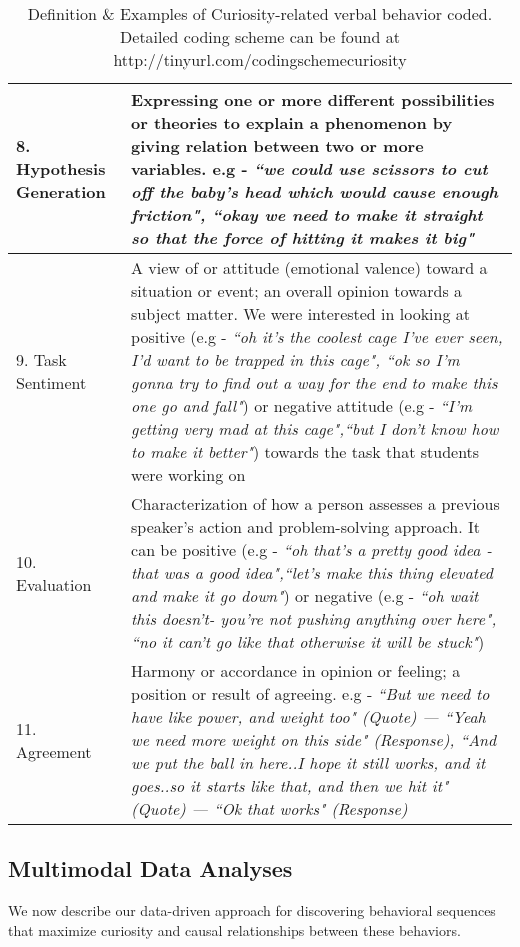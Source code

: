 \documentclass{llncs}
\begin{document}
\begin{table*} [hp]
{\begin{tabular}{|p{3.7cm}|p{13cm}|}
8. Hypothesis Generation & Expressing one or more different possibilities or theories to explain a phenomenon by giving relation between two or more variables. e.g - {\em ``we could use scissors to cut off the baby's head which would cause enough friction", ``okay we need to make it straight so that the force of hitting it makes it big"} \\ \hline
9. Task Sentiment & A view of or attitude (emotional valence) toward a situation or event; an overall opinion towards a subject matter. We were interested in looking at positive (e.g - {\em ``oh it's the coolest cage I've ever seen, I'd want to be trapped in this cage", ``ok so I'm gonna try to find out a way for the end to make this one go and fall"}) or negative attitude (e.g - {\em ``I'm getting very mad at this cage",``but I don't know how to make it better"}) towards the task that students were working on \\ \hline 
10. Evaluation  &  Characterization of how a person assesses a previous speaker’s action and problem-solving approach. It can be positive (e.g - {\em ``oh that's a pretty good idea - that was a good idea",``let's make this thing elevated and make it go down"}) or negative (e.g - {\em ``oh wait this doesn't- you're not pushing anything over here", ``no it can't go like that otherwise it will be stuck"}) \\ \hline
11. Agreement & Harmony or accordance in opinion or feeling; a position or result of agreeing. e.g - {\em ``But we need to have like power, and weight too" {\em (Quote)} --- ``Yeah we need more weight on this side" {\em (Response)}, ``And we put the ball in here..I hope it still works, and it goes..so it starts like that, and then we hit it" {\em (Quote)} --- ``Ok that works" {\em (Response)}} \\ \hline 
\end{tabular}}
\caption{Definition \& Examples of Curiosity-related verbal behavior coded. Detailed coding scheme can be found at http://tinyurl.com/codingschemecuriosity}\label{tab:1}
\end{table*}
\vspace{-1.6cm}

\subsection{Multimodal Data Analyses}
\vspace{-0.25cm}
We now describe our data-driven approach for discovering behavioral sequences that maximize curiosity and causal relationships between these behaviors.
\vspace{-0.28cm}
\end{document}
